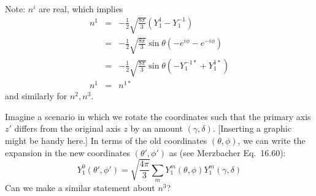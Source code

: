 \documentclass[11pt]{article}
\begin{document}
\noindent
Note: $n^i$ are real, which implies
\begin{eqnarray}
n^1 &=& -\frac{1}{2} \sqrt{\frac{8 \pi}{3}} \left( Y_1^1 - Y_1^{-1} \right) \\
&=&  -\frac{1}{2} \sqrt{\frac{8 \pi}{3}} \sin \theta \left( -e^{i \phi} - e^{-i\phi}  \right) \\
&=& -\frac{1}{2} \sqrt{\frac{8 \pi}{3}} \sin \theta \left( -Y_1^{-1*} + Y_1^{1*} \right) \\
n^1 &=& n^{1*}
\end{eqnarray}
and similarly for $n^2, n^3$.

\noindent
Imagine a scenario in which we rotate the coordinates such that the primary axis $z'$ differs from the original axis $z$ by an amount $(\gamma, \delta)$. [Inserting a graphic might be handy here.] In terms of the old coordinates $(\theta, \phi)$, we can write the expansion in the new coordinates $(\theta', \phi')$ as (see Merzbacher Eq.~16.60):
\begin{equation}
Y_1^0 (\theta', \phi') = \sqrt{\frac{4 \pi}{3}} \sum_m Y_1^m(\theta, \phi) Y_1^m(\gamma, \delta)
\end{equation}
Can we make a similar statement about $n^3$?
\end{document}
